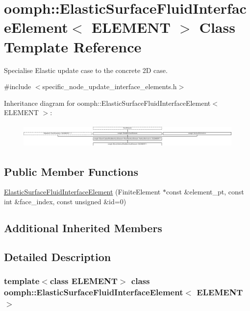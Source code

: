 \hypertarget{classoomph_1_1ElasticSurfaceFluidInterfaceElement}{}\section{oomph\+:\+:Elastic\+Surface\+Fluid\+Interface\+Element$<$ E\+L\+E\+M\+E\+NT $>$ Class Template Reference}
\label{classoomph_1_1ElasticSurfaceFluidInterfaceElement}


Specialise Elastic update case to the concrete 2D case.  




{\ttfamily \#include $<$specific\+\_\+node\+\_\+update\+\_\+interface\+\_\+elements.\+h$>$}

Inheritance diagram for oomph\+:\+:Elastic\+Surface\+Fluid\+Interface\+Element$<$ E\+L\+E\+M\+E\+NT $>$\+:\begin{figure}[H]
\begin{center}
\leavevmode
\includegraphics[height=1.261261cm]{classoomph_1_1ElasticSurfaceFluidInterfaceElement}
\end{center}
\end{figure}
\subsection*{Public Member Functions}
\begin{DoxyCompactItemize}
\item 
\hyperlink{classoomph_1_1ElasticSurfaceFluidInterfaceElement_aa2add34e23b16990c7000d699bc395e2}{Elastic\+Surface\+Fluid\+Interface\+Element} (Finite\+Element $\ast$const \&element\+\_\+pt, const int \&face\+\_\+index, const unsigned \&id=0)
\end{DoxyCompactItemize}
\subsection*{Additional Inherited Members}


\subsection{Detailed Description}
\subsubsection*{template$<$class E\+L\+E\+M\+E\+NT$>$\newline
class oomph\+::\+Elastic\+Surface\+Fluid\+Interface\+Element$<$ E\+L\+E\+M\+E\+N\+T $>$}

